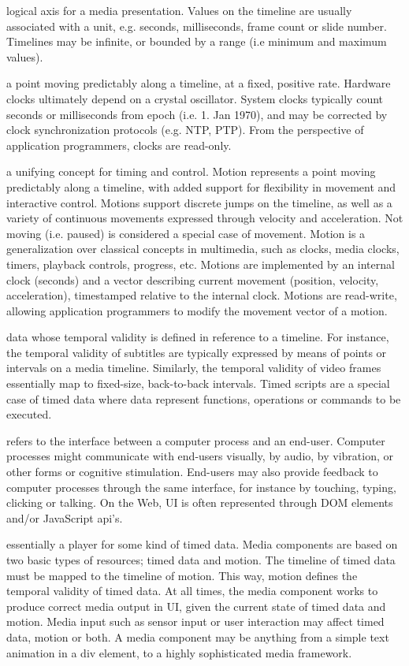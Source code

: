 
 logical axis for a media presentation. Values on the timeline are usually associated with a unit, e.g. seconds, milliseconds, frame count or slide number. Timelines may be infinite, or bounded by a range (i.e minimum and maximum values).

 a point moving predictably along a timeline, at a fixed, positive rate. Hardware clocks ultimately depend on a crystal oscillator. System clocks typically count seconds or milliseconds from epoch (i.e. 1. Jan 1970), and may be corrected by clock synchronization protocols (e.g. NTP, PTP). From the perspective of application programmers, clocks are read-only.

 a unifying concept for timing and control. Motion represents a point moving predictably along a timeline, with added support for flexibility in movement and interactive control. Motions support discrete jumps on the timeline, as well as a variety of continuous movements expressed through velocity and acceleration. Not moving (i.e. paused) is considered a special case of movement. Motion is a generalization over classical concepts in multimedia, such as clocks, media clocks, timers, playback controls, progress, etc. Motions are implemented by an internal clock (seconds) and a vector describing current movement (position, velocity, acceleration), timestamped relative to the internal clock. Motions are read-write, allowing application programmers to modify the movement vector of a motion.

 data whose temporal validity is defined in reference to a timeline. For instance, the temporal validity of subtitles are typically expressed by means of points or intervals on a media timeline. Similarly, the temporal validity of video frames essentially map to fixed-size, back-to-back intervals. Timed scripts are a special case of timed data where data represent functions, operations or commands to be executed.

 refers to the interface between a computer process and an end-user. Computer processes might communicate with end-users visually, by audio, by vibration, or other forms or cognitive stimulation. End-users may also provide feedback to computer processes through the same interface, for instance by touching, typing, clicking or talking. On the Web, UI is often represented through DOM elements and/or JavaScript api’s. 

 essentially a player for some kind of timed data. Media components are based on two basic types of resources; timed data and motion. The timeline of timed data must be mapped to the timeline of motion. This way, motion defines the temporal validity of timed data. At all times, the media component works to produce correct media output in UI, given the current state of timed data and motion. Media input such as sensor input or user interaction may affect timed data, motion or both. A media component may be anything from a simple text animation in a div element, to a highly sophisticated media framework.




